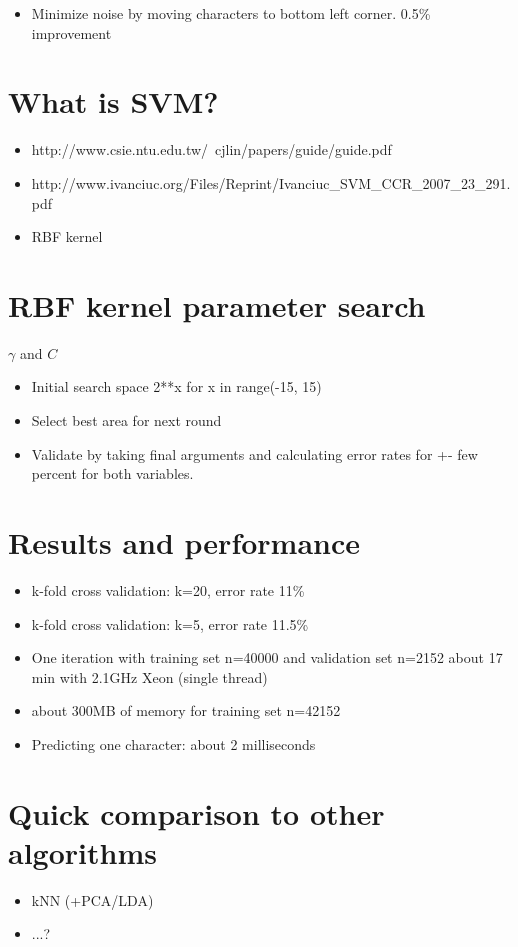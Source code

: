 \documentclass{netsec2012}
\begin{document}
\begin{itemize}
\item Minimize noise by moving characters to bottom left corner. 0.5\% improvement
\end{itemize}

\section{What is SVM?}

\begin{itemize}
\item http://www.csie.ntu.edu.tw/~cjlin/papers/guide/guide.pdf
\item http://www.ivanciuc.org/Files/Reprint/Ivanciuc\_SVM\_CCR\_2007\_23\_291.pdf
\item RBF kernel
\end{itemize}


\section{RBF kernel parameter search}

$\gamma$ and $C$

\begin{itemize}
\item Initial search space 2**x for x in range(-15, 15)
\item Select best area for next round
\item Validate by taking final arguments and calculating error rates for +- few percent for both variables.
\end{itemize}

\section{Results and performance}

\begin{itemize}
\item k-fold cross validation: k=20, error rate 11\%
\item k-fold cross validation: k=5, error rate 11.5\%
\item One iteration with training set n=40000 and validation set n=2152 about 17 min with 2.1GHz Xeon (single thread)
\item about 300MB of memory for training set n=42152
\item Predicting one character: about 2 milliseconds

\end{itemize}

\section{Quick comparison to other algorithms}

\begin{itemize}
\item kNN (+PCA/LDA)
\item ...?
\end{itemize}


\cite{albanese12mlpy}



\end{document}
